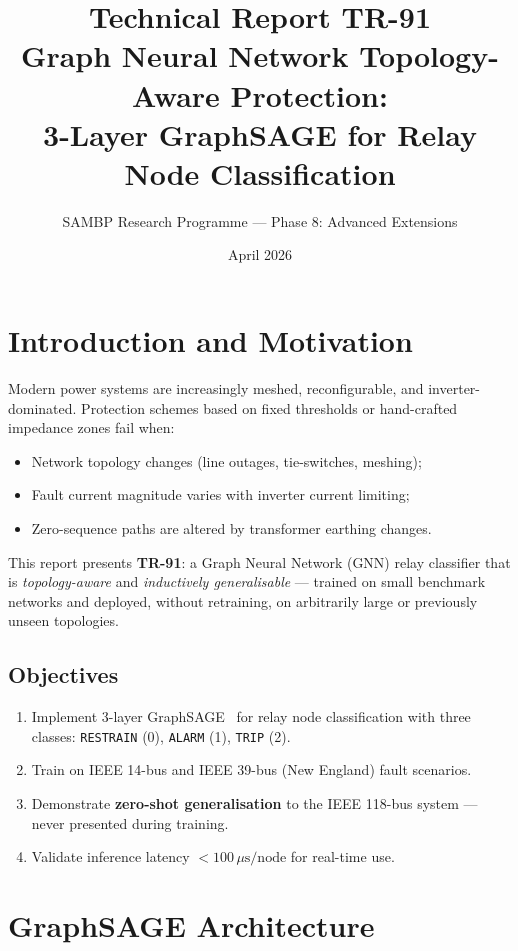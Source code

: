 \documentclass[11pt,a4paper]{article}
\title{\textbf{Technical Report TR-91}\\[4pt]
       \large Graph Neural Network Topology-Aware Protection:\\
       3-Layer GraphSAGE for Relay Node Classification}
\author{SAMBP Research Programme --- Phase 8: Advanced Extensions}
\date{April 2026}
\begin{document}
\maketitle
\tableofcontents
\newpage

\section{Introduction and Motivation}
\label{sec:intro}

Modern power systems are increasingly meshed, reconfigurable, and
inverter-dominated. Protection schemes based on fixed thresholds or
hand-crafted impedance zones fail when:
\begin{itemize}
  \item Network topology changes (line outages, tie-switches, meshing);
  \item Fault current magnitude varies with inverter current limiting;
  \item Zero-sequence paths are altered by transformer earthing changes.
\end{itemize}

This report presents \textbf{TR-91}: a Graph Neural Network (GNN) relay
classifier that is \emph{topology-aware} and \emph{inductively generalisable}
--- trained on small benchmark networks and deployed, without retraining, on
arbitrarily large or previously unseen topologies.

\subsection{Objectives}
\begin{enumerate}
  \item Implement 3-layer GraphSAGE~\cite{hamilton2017} for relay node
        classification with three classes:
        \texttt{RESTRAIN} (0), \texttt{ALARM} (1), \texttt{TRIP} (2).
  \item Train on IEEE 14-bus and IEEE 39-bus (New England) fault scenarios.
  \item Demonstrate \textbf{zero-shot generalisation} to the IEEE 118-bus system
        --- never presented during training.
  \item Validate inference latency $<\!100\,\mu\text{s/node}$ for real-time use.
\end{enumerate}

\section{GraphSAGE Architecture}
\label{sec:arch}
\end{document}
